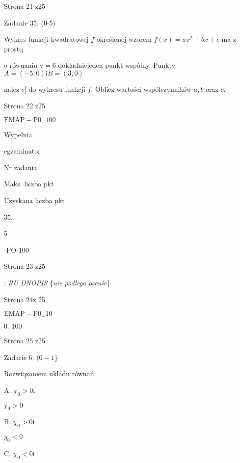 \documentclass[a4paper,12pt]{article}
\begin{document}
Strona 21 z25





Zadanie 35. (0-5)

Wykres funkcji kwadratowej $f$ określonej wzorem $f(x)=ax^{2}+bx+c$ ma z prostq

o równaniu $\mathrm{y}=6$ dokladniejeden punkt wspólny. Punkty $A=(-5,0) \mathrm{i} B=(3,0)$

nalez $\mathrm{c}$] do wykresu funkcji $f$. Oblicz wartości wspólczynników $a, b$ oraz $c.$

Strona 22 z25

$\mathrm{E}\mathrm{M}\mathrm{A}\mathrm{P}-\mathrm{P}0_{-}100$





Wypelnia

egzaminator

Nr zadania

Maks. liczba pkt

Uzyskana liczba pkt

35.

5

-PO-100

Strona 23 z25





: {\it RU DNOPIS} \{{\it nie podlega ocenie}\}

Strona 24z 25

$\mathrm{E}\mathrm{M}\mathrm{A}\mathrm{P}-\mathrm{P}0_{-}10$





$0_{-}100$

Strona 25 z25




















Zadarie 6. $(0-1$\}

Rozwiqzaniem ukladu równań 

A. $\chi_{0}>0 \mathrm{i}$

$\mathrm{y}_{0}>0$

B. $\chi_{0}>0 \mathrm{i}$

$y_{0}<0$

C. $\chi_{0}<0 \mathrm{i}$
\end{document}
